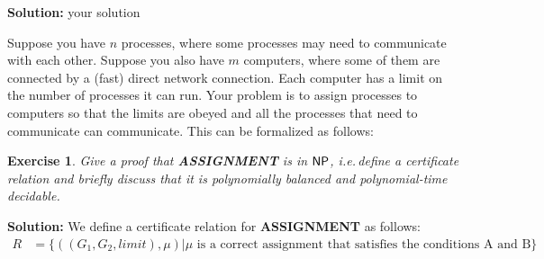 \documentclass [10pt]{article}
\newtheorem{exercise}[theorem]{Exercise}
\newcommand{\ccfont}[1]{\protect\mathsf{#1}}
\newcommand{\NP}{\ccfont{NP}}
\begin{document}
\medskip

\textbf{Solution:} your solution


\medskip

  Suppose you have $n$ processes, where some processes may need to
  communicate with each other. Suppose you also have $m$ computers,
  where some of them are connected by a (fast) direct network
  connection. Each computer has a limit on the number of processes it
  can run. Your problem is to assign processes to computers so that
  the limits are obeyed and all the processes that need to communicate
  can communicate. This can be formalized as follows:

  \begin{center}
  \end{center}





\begin{exercise}
    Give a proof that \textbf{ASSIGNMENT} is in $\NP$, i.e.\,define a
    certificate relation and briefly discuss that it is polynomially
    balanced and polynomial-time decidable.
\end{exercise}

\medskip

\textbf{Solution:}
We define a certificate relation for \textbf{ASSIGNMENT} as follows:\\
\begin{align}
 R &= \{ ((G_1, G_2, limit), \mu) | \mu \text{ is a correct assignment that satisfies the conditions A and B} \}
\end{align}
\end{document}

